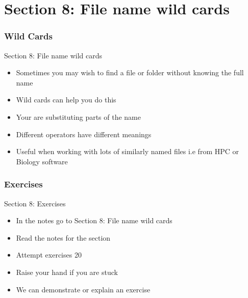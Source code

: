 \part{Section 8: File name wild cards}
\begin{frame}
\partpage
\end{frame}

\section{Wild Cards}
\begin{frame}{Section 8: File name wild cards}
\begin{itemize}
\item Sometimes you may wish to find a file or folder without knowing the full name
\item Wild cards can help you do this
\item Your are substituting parts of the name
\item Different operators have different meanings
\item Useful when working with lots of similarly named files i.e from HPC or Biology software
\end{itemize}
\end{frame}


\section{Exercises}
\begin{frame}{Section 8: Exercises}
\begin{itemize}
\item In the notes go to {Section 8: File name wild cards}
\item Read the notes for the section 
\item Attempt exercises 20
\item Raise your hand if you are stuck
\item We can demonstrate or explain an exercise
\end{itemize}
\end{frame}

